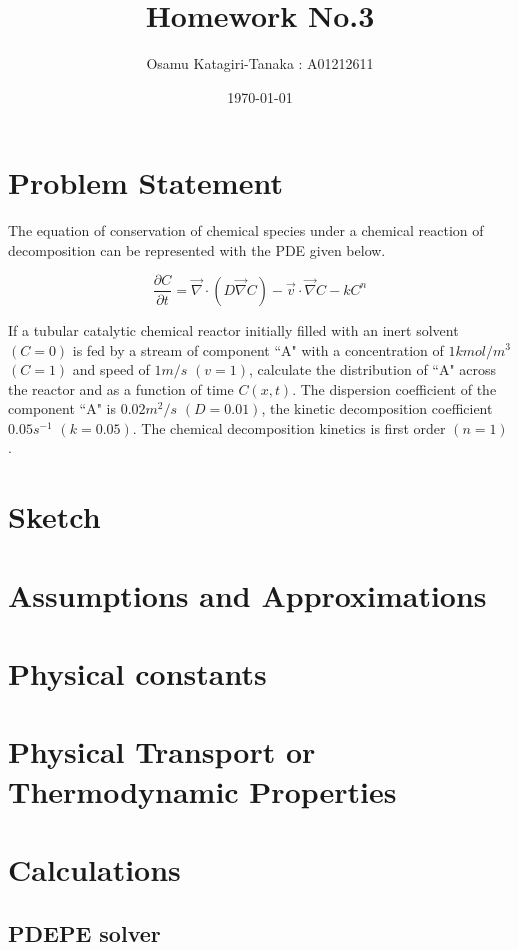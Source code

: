 \documentclass{article}
\title{Homework No.3}
\author{Osamu Katagiri-Tanaka : A01212611}
\date{\today}
\begin{document}
\maketitle

\section{Problem Statement}

The equation of conservation of chemical species under a chemical reaction of
decomposition can be represented with the PDE given below.

$$ \frac{\partial C}{\partial t} = \vec{\nabla} \cdot (D \vec{\nabla} C) - \vec{v} \cdot \vec{\nabla} C - k C^n $$

If a tubular catalytic chemical reactor initially filled with an inert solvent $(C = 0)$ is fed by a stream of component ``A" with a concentration of $1 kmol/m^3$ $(C = 1)$ and speed of $1 m/s$ $(v = 1)$, calculate the distribution of ``A" across the reactor and as a function of time $C(x, t)$. The dispersion coefficient of the component ``A" is $0.02 m^2/s$ $(D = 0.01)$, the kinetic decomposition coefficient $0.05 s^{-1}$ $(k = 0.05)$. The chemical decomposition kinetics is first order $(n = 1)$.

\section{Sketch}

\section{Assumptions and Approximations}


\section{Physical constants}

\section{Physical Transport or Thermodynamic Properties}

\section{Calculations}

\subsection{PDEPE solver}
\end{document}
